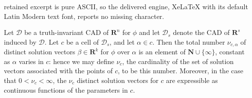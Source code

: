 \documentclass[10pt,a4paper]{amsart}
\def\N{\mathbf{ N}}
\def\R{\mathbf{ R}}
\begin{document}
retained excerpt is pure ASCII, so the delivered engine, XeLaTeX with its default Latin Modern text font, reports no missing character.
\begin{proposition} \label{Invariance of solution vector cardinality}
    Let $\mathcal{D}$ be a truth-invariant CAD of $\R^n$ 
    for $\phi$ and let $\mathcal{D}_s$ denote the CAD of $\R^s$ induced 
    by $\mathcal{D}$.
    Let $c$ be a cell of $\mathcal{D}_s$,
    and let $\alpha \in c$. Then the total number $\nu_{c, \alpha}$
    of distinct solution vectors $\beta \in \R^k$ for $\phi$
    over $\alpha$ is an element of 
    $\N \cup \{\infty\}$, constant as $\alpha$ varies in $c$:
    hence we may define $\nu_c$, the cardinality of the set of
    solution vectors associated with the points of $c$, to be this number.
    Moreover, in the case that $0 < \nu_c < \infty$, the $\nu_c$ distinct
    solution vectors for $c$ are expressible as continuous functions
    of the parameters in $c$.
\end{proposition}
\end{document}
